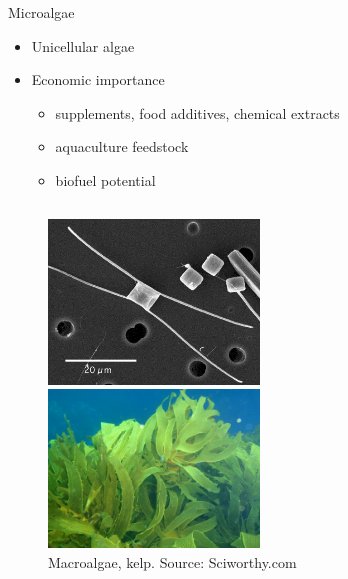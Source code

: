 \documentclass[8pt]{beamer}\usepackage[]{graphicx}\usepackage[]{color}
\begin{document}
\begin{frame}{Microalgae}
\begin{itemize}
\item Unicellular algae
\item Economic importance 
  \begin{itemize}
  \item supplements, food additives, chemical extracts
  \item aquaculture feedstock
  \item biofuel potential
  \end{itemize}
\end{itemize}

\begin{columns}[t] %
                
                \begin{figure}
        \centering
                \includegraphics[width=0.5\textwidth]{./figure/Chaetoceros}
                \caption{Microalgae, \textit{Chaetoceros}. Source: sci.sdsu.edu}
                \label{fig:gull}
                \includegraphics[width=0.5\textwidth]{./figure/Kelp_forest_sciworthy_com}
                \caption{Macroalgae, kelp. Source: Sciworthy.com}
                \label{fig:tiger}
\end{figure}


\end{columns}
\end{frame}
\end{document}

